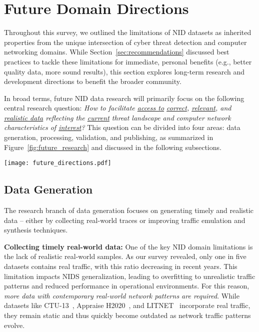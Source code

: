 
\section{Future Domain Directions}
\label{sec:future_directions}

Throughout this survey, we outlined the limitations of NID datasets as inherited properties from the unique intersection of cyber threat detection and computer networking domains. While Section~\ref{sec:recommendations} discussed best practices to tackle these limitations for immediate, personal benefits (e.g., better quality data, more sound results), this section explores long-term research and development directions to benefit the broader community.

In broad terms, future NID data research will primarily focus on the following central research question: \emph{How to facilitate \underline{access to} \underline{correct}, \underline{relevant}, and \underline{realistic data} reflecting the \underline{current} threat landscape and computer network characteristics of \underline{interest}?} This question can be divided into four areas: data generation, processing, validation, and publishing, as summarized in Figure~\ref{fig:future_research} and discussed in the following subsections.

\begin{figure*}[t]
    \centering
    \texttt{[image: future\_directions.pdf]}
    \vspace*{-1em}
    \caption{Future NID data research and development directions. We divide them into areas focused on generating, processing, validating, and publishing the data.}
    \label{fig:future_research}
\end{figure*}

\subsection{Data Generation}

The research branch of data generation focuses on generating timely and realistic data -- either by collecting real-world traces or improving traffic emulation and synthesis techniques.

\textbf{Collecting timely real-world data:} One of the key NID domain limitations is the lack of realistic real-world samples. As our survey revealed, only one in five datasets contains real traffic, with this ratio decreasing in recent years. This limitation impacts NIDS generalization, leading to overfitting to unrealistic traffic patterns and reduced performance in operational environments. For this reason, \emph{more data with contemporary real-world network patterns are required}. While datasets like CTU-13~\cite{garcia2014_ctu13}, Appraise H2020~\cite{komisarek2023_appraise_h2020_dataset}, and LITNET~\cite{damasevicius2020_litnet2020} incorporate real traffic, they remain static and thus quickly become outdated as network traffic patterns evolve.

